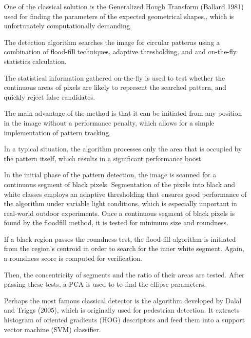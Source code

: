 \documentclass[a4paper]{report}
\begin{document}
One of the classical solution is the Generalized Hough Transform (Ballard 1981) used for finding the parameters of the expected geometrical shapes,, which is
unfortunately computationally demanding.


The detection algorithm searches the image for circular patterns using a combination of flood-fill techniques, adaptive thresholding, and and on-the-fly statistics calculation.

The statistical information gathered on-the-fly is used to test
whether the continuous areas of pixels are likely to represent
the searched pattern, and quickly reject false candidates. 


The main advantage of the method is that it can be initiated from
any position in the image without a performance penalty,
which allows for a simple implementation of pattern tracking.


In a typical situation, the algorithm processes only the area that is occupied by the pattern itself, which results in a significant performance boost.

In the initial phase of the pattern detection, the image is scanned for a continuous segment of black pixels. Segmentation of the pixels into black and white classes employs an adaptive thresholding that ensures good performance of the algorithm under variable light conditions, which is especially important in real-world outdoor experiments. Once a continuous segment of black pixels is found by the floodfill
method, it is tested for minimum size and roundness.


If a black region passes the roundness test, the flood-fill algorithm is initiated from the region’s centroid in order to search for the inner white segment. Again, a roundness score is computed for verification.

Then, the concentricity of segments and the ratio of their areas are tested. After passing these tests, a PCA is used to to find the ellipse parameters.





Perhaps the most famous classical detector is the algorithm developed by Dalal
and Triggs (2005), which is originally used for pedestrian detection. It extracts histogram of oriented gradients (HOG) descriptors and feed them into a support vector machine (SVM) classifier.
\end{document}
